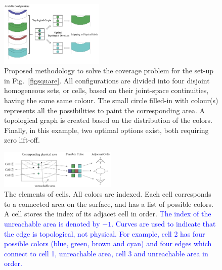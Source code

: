\documentclass[journal]{IEEEtran}
\begin{document}
\begin{figure}[t]
\centering
\includegraphics[width = 0.44\textwidth]{flowchart}
\caption{Proposed methodology to solve the coverage problem for the set-up in Fig.~\ref{figsquare}. 
All configurations are divided into four disjoint homogeneous sets, or cells, based on their joint-space continuities, 
having the same same colour. 
The small circle filled-in with colour(s) represents all the possibilities to paint the corresponding area. A topological graph is created based on the distribution of the colors. Finally, in this example, two optimal options exist, both requiring zero lift-off.}\label{flowchart}
\end{figure}


\begin{figure}[t]
\centering
\includegraphics[width = 0.5\textwidth]{square_example/graphcreation_2}
\caption{
The elements of cells. All colors are indexed. Each cell corresponds to a connected area on the surface, and has a list of possible colors. A cell stores the index of its adjacet cell in order. %
\textcolor{blue}{
The index of the unreachable area is denoted by $-1$. Curves are used to indicate that the edge is topological, not physical. For example, cell 2 has four possible colors (blue, green, brown and cyan) and four edges which connect to cell 1, unreachable area, cell 3 and unreachable area in order. }}
\label{figforcolor}
\end{figure} 
\end{document}

